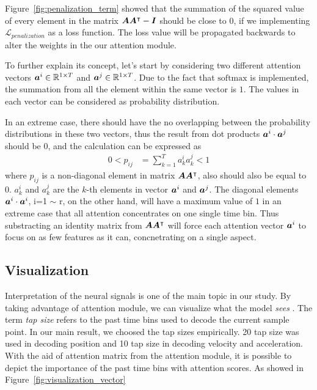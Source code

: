
\noindent Figure~\ref{fig:penalization_term} showed that the summation of the squared value of every element in the matrix ${\boldsymbol{A}} {\boldsymbol{A}}^{\intercal} - {\boldsymbol{I}}$ should be close to $0$,
if we implementing $\mathcal{L}_{penalization}$ as a loss function.
The loss value will be propagated backwards to alter the weights in the our attention module.

To further explain its concept,
let's start by considering two different attention vectors $ {\boldsymbol{a}}^i \in \mathbb{R}^{1 \times T} $ and $ {\boldsymbol{a}}^j \in \mathbb{R}^{1 \times T}$.
Due to the fact that $ \text{softmax} $ is implemented,
the summation from all the element within the same vector is $1$.
The values in each vector can be considered as probability distribution.

In an extreme case, 
there should have the no overlapping between the probability distributions in these two vectors, 
thus the result from dot products $ {\boldsymbol{a}}^i \cdot {\boldsymbol{a}}^j $ should be $0$, and the calculation can be expressed as
\begin{align}
    0 < p_{ij} &= \sum^{T}_{k=1} a^i_k a^j_k < 1
\end{align}
\noindent where $p_{ij}$ is a non-diagonal element in matrix ${\boldsymbol{A}} {\boldsymbol{A}}^{\intercal}$, 
also should also be equal to $0$.
$ a^i_k $ and $ a^j_k $ are the $k$-th elements in vector $ {\boldsymbol{a}}^i$ and $ {\boldsymbol{a}}^j $.
The diagonal elements $ {\boldsymbol{a}}^i \cdot {\boldsymbol{a}}^i $, i=1 $\sim$ r, on the other hand,
will have a maximum value of $ 1 $ in an extreme case that all attention concentrates on one single time bin.
Thus substracting an identity matrix from ${\boldsymbol{A}} {\boldsymbol{A}}^{\intercal}$ will force each attention vector ${\boldsymbol{a}}^i$ to focus on as few features as it can,
concnetrating on a single aspect.


\subsection{Visualization}
Interpretation of the neural signals is one of the main topic in our study.
By taking advantage of attention module, we can visualize what the model \textit{sees} \citep{xu2015show}.
The term \textit{tap size} refers to the past time bins used to decode the current sample point.
In our main result,
we choosed the tap sizes empirically.
20 tap size was used in decoding position and 10 tap size in decoding velocity and acceleration.
With the aid of attention matrix from the attention module,
it is possible to depict the importance of the past time bins with attention scores.
As showed in Figure~\ref{fig:visualization_vector}

